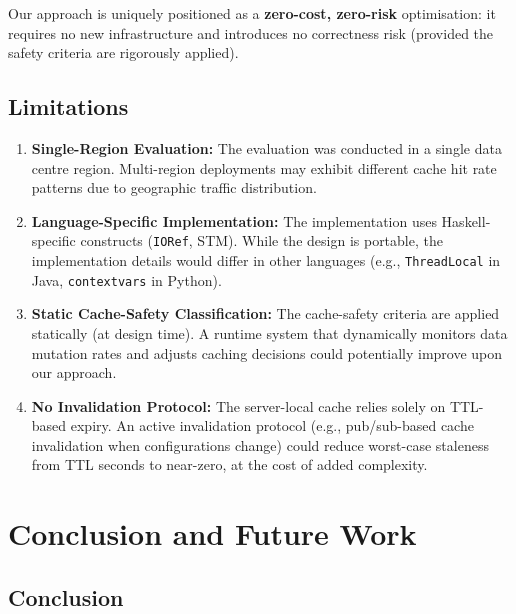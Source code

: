 \documentclass[12pt,a4paper]{report}
\begin{document}
Our approach is uniquely positioned as a \textbf{zero-cost, zero-risk} optimisation: it requires no new infrastructure and introduces no correctness risk (provided the safety criteria are rigorously applied).

\section{Limitations}

\begin{enumerate}
    \item \textbf{Single-Region Evaluation:} The evaluation was conducted in a single data centre region. Multi-region deployments may exhibit different cache hit rate patterns due to geographic traffic distribution.

    \item \textbf{Language-Specific Implementation:} The implementation uses Haskell-specific constructs (\texttt{IORef}, STM). While the design is portable, the implementation details would differ in other languages (e.g., \texttt{ThreadLocal} in Java, \texttt{contextvars} in Python).

    \item \textbf{Static Cache-Safety Classification:} The cache-safety criteria are applied statically (at design time). A runtime system that dynamically monitors data mutation rates and adjusts caching decisions could potentially improve upon our approach.

    \item \textbf{No Invalidation Protocol:} The server-local cache relies solely on TTL-based expiry. An active invalidation protocol (e.g., pub/sub-based cache invalidation when configurations change) could reduce worst-case staleness from TTL seconds to near-zero, at the cost of added complexity.
\end{enumerate}


\chapter{Conclusion and Future Work}

\section{Conclusion}
\end{document}
